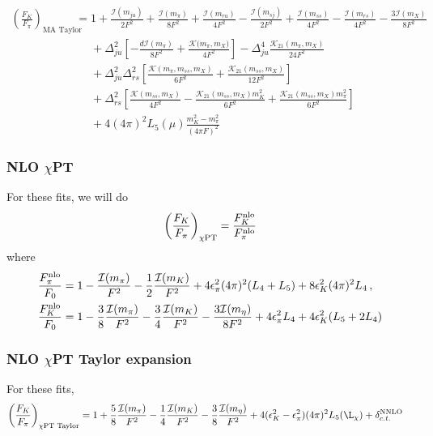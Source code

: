 \documentclass[prd,tightenlines,preprintnumbers,showpacs,superscriptaddress,notitlepage,nofootinbib,eqsecnum,floatfix,notitlepage]{revtex4-1}
\begin{document}
\begin{align}\label{eq:fkfpi_ma}
\left(\frac{F_K}{F_\pi}\right)_\text{MA Taylor} &= 1
+\frac{\mathcal{I}(m_{ju})}{2F^2}
+\frac{\mathcal{I}(m_\pi)}{8F^2}
+\frac{\mathcal{I}(m_{ru})}{4F^2}
-\frac{\mathcal{I}(m_{sj})}{2F^2}
+\frac{\mathcal{I}(m_{ss})}{4F^2}
-\frac{\mathcal{I}(m_{rs})}{4F^2}
-\frac{3\mathcal{I}(m_X)}{8F^2}
\nonumber\\&\phantom{=}
+\Delta_{ju}^2 \left[ -\frac{d\mathcal{I}(m_\pi)}{8F^2} + \frac{\mathcal{K(}m_\pi,m_X)}{4F^2} \right]
-\Delta_{ju}^4 \frac{\mathcal{K}_{21}(m_\pi,m_X)}{24 F^2}
\nonumber\\&\phantom{=}
+\Delta_{ju}^2\Delta_{rs}^2 \left[ \frac{\mathcal{K}(m_\pi, m_{ss}, m_X)}{6F^2}
+\frac{\mathcal{K}_{21}(m_{ss},m_X)}{12F^2} \right]
\nonumber\\&\phantom{=}
+\Delta_{rs}^2 \left[
\frac{\mathcal{K}(m_{ss},m_X)}{4F^2} 
-\frac{\mathcal{K}_{21}(m_{ss},m_X) m_K^2}{6F^2}
+\frac{\mathcal{K}_{21}(m_{ss},m_X) m_\pi^2}{6F^2}
\right]
\nonumber\\&\phantom{=}
+ 4 (4\pi)^2 L_5(\mu) \frac{m_K^2 - m_\pi^2}{(4\pi F)^2}
\end{align}

\subsubsection{NLO $\chi$PT}
For these fits, we will do
\begin{equation}
\left(\frac{F_K}{F_\pi}\right)_\text{$\chi$PT} = \frac{F_K^{\rm nlo}}{F_\pi^{\rm nlo}}
\end{equation}
where
\begin{align}
\frac{F_\pi^{\rm nlo}}{F_0} &= 1
- \frac{\mathcal{I}(m_\pi)}{F^2}
-\frac{1}{2}\frac{\mathcal{I}(m_K)}{F^2}
+4 \epsilon_\pi^2 (4\pi)^2 (L_4 + L_5)
+8 \epsilon_K^2 (4\pi)^2 L_4 \, , \\
\frac{F_K^{\rm nlo}}{F_0} &= 1
-\frac{3}{8}\frac{\mathcal{I}(m_\pi)}{F^2}
-\frac{3}{4}\frac{\mathcal{I}(m_K)}{F^2}
-\frac{3\mathcal{I}(m_\eta)}{8F^2}
+4\epsilon_\pi^2 L_4 + 4\epsilon_K^2(L_5 + 2L_4)
\end{align}


\subsubsection{NLO $\chi$PT Taylor expansion}
For these fits, 
\begin{align}\label{eq:fkfpi_chpt}
\left(\frac{F_K}{F_\pi}\right)_\text{$\chi$PT Taylor} &= 1
+\frac{5}{8} \frac{\mathcal{I}(m_\pi)}{F^2}
-\frac{1}{4} \frac{\mathcal{I}(m_K)}{F^2}
-\frac{3}{8} \frac{\mathcal{I}(m_\eta)}{F^2}
+4(\epsilon_K^2 - \epsilon_\pi^2) (4\pi)^2 L_5(\L_{\chi})
+ \delta_{c.t.}^{\rm NNLO}
\end{align}
\end{document}
